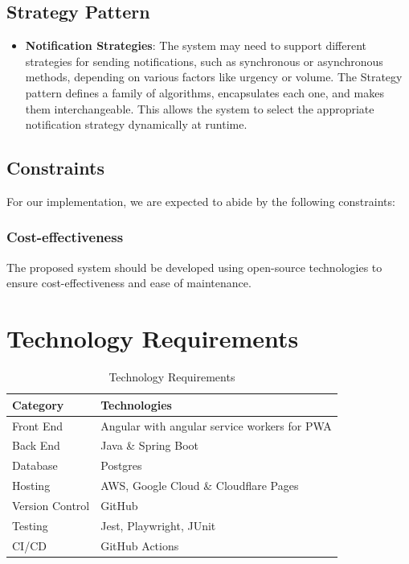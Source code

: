 \documentclass[a4paper,12pt]{article}
\begin{document}
\subsection*{Strategy Pattern}
\begin{itemize}[label=--]
    \item \textbf{Notification Strategies}: The system may need to support different strategies for sending 
    notifications, such as synchronous or asynchronous methods, depending on various factors like urgency or 
    volume. The Strategy pattern defines a family of algorithms, encapsulates each one, and makes them interchangeable. 
    This allows the system to select the appropriate notification strategy dynamically at runtime.
\end{itemize}


\subsection{Constraints}
\label{subsec:constraints}
For our implementation, we are expected to abide by the following constraints:
\subsubsection{Cost-effectiveness}
The proposed system should be developed using open-source technologies to ensure cost-effectiveness and ease of maintenance.

\section{Technology Requirements}
\label{sec:technology-requirements}
\begin{table}[htbp]
\centering
\caption{Technology Requirements}
\label{tab:technology-requirements}
\begin{tabular}{|>{\raggedright}p{3.5cm}|p{8.5cm}|}
\hline
\textbf{Category} & \textbf{Technologies} \\
\hline
Front End & Angular with angular service workers for PWA \\
\hline
Back End & Java \& Spring Boot \\
\hline
Database & Postgres \\
\hline
Hosting & AWS, Google Cloud \& Cloudflare Pages \\
\hline
Version Control & GitHub \\
\hline
Testing & Jest, Playwright, JUnit \\
\hline
CI/CD & GitHub Actions \\
\hline
\end{tabular}
\end{table}
\end{document}

